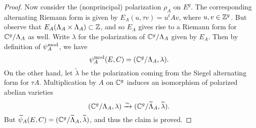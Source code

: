 \documentclass{amsart}
\begin{document}
\begin{proof}
Now consider the (nonprincipal) polarization $\rho_A$ on $E^g$. The corresponding alternating Riemann form is given by $E_A(u,\tau v) = u^tAv$, where $u,v \in \mathbb{Z}^g$. But observe that $E_A(\Lambda_A \times \Lambda_A) \subset \mathbb{Z}$, and so $E_A$ gives rise to a Riemann form for $\mathbb{C}^g/\Lambda_A$ as well. Write $\lambda$ for the polarization of $\mathbb{C}^g/\Lambda_A$ given by $E_A$. Then by definition of $\psi_{A}^\mathrm{mod}$, we have
\[
  \psi_{A}^\mathrm{mod}(E,C) = (\mathbb{C}^g/\Lambda_A, \lambda).
\]
On the other hand, let $\tilde{\lambda}$ be the polarization coming from the Siegel alternating form for $\tau A$. Multiplication by $A$ on $\mathbb{C}^g$ induces an isomorphism of polarized abelian varieties
\[
  (\mathbb{C}^g/\Lambda_A, \lambda) \xrightarrow{\sim} (\mathbb{C}^g/\widetilde{\Lambda}_A, \widetilde{\lambda}).
\]
But $\widetilde{\psi}_{A}(E,C) = (\mathbb{C}^g/\widetilde{\Lambda}_A, \widetilde{\lambda})$, and thus the claim is proved.



\end{proof}
\end{document}
